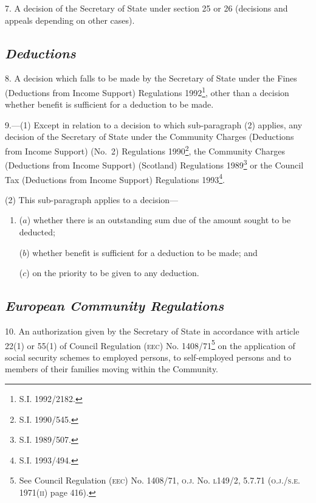 \documentclass[12pt,a4paper]{article}
\begin{document}
7.  A decision of the Secretary of State under section 25 or 26 (decisions and appeals depending on other cases).

\subsection*{\itshape Deductions}

8.  A decision which falls to be made by the Secretary of State under the Fines (Deductions from Income Support) Regulations 1992\footnote{\frenchspacing S.I. 1992/2182.}, other than 
a decision whether benefit is sufficient for a deduction to be made.  %


\medskip

9.—(1) Except in relation to a decision to which sub-paragraph (2) applies, any decision of the Secretary of State under the Community Charges (Deductions from Income Support) (No.\ 2) Regulations 1990\footnote{\frenchspacing S.I. 1990/545.}, the Community Charges (Deductions from Income Support) (Scotland) Regulations 1989\footnote{\frenchspacing S.I. 1989/507.} or the Council Tax (Deductions from Income Support) Regulations 1993\footnote{\frenchspacing S.I. 1993/494.}.

(2) This sub-paragraph applies to a decision—
\begin{enumerate}\item[]
($a$) whether there is an outstanding sum due of the amount sought to be deducted;

($b$) whether benefit is sufficient for a deduction to be made; and

($c$) on the priority to be given to any deduction.
\end{enumerate}

\subsection*{\itshape European Community Regulations}

10.  An authorization given by the Secretary of State in accordance with article 22(1) or 55(1) of Council Regulation \textsc{\lowercase{(EEC)}} No. 1408/71\footnote{\frenchspacing See Council Regulation \textsc{\lowercase{(EEC)}} No. 1408/71, \textsc{\lowercase{O.J.}} No. \textsc{\lowercase{L149/2, 5.7.71 (O.J./S.E. 1971(II)}} page 416).} on the application of social security schemes to employed persons, to self-employed persons and to members of their families moving within the Community.
\end{document}
